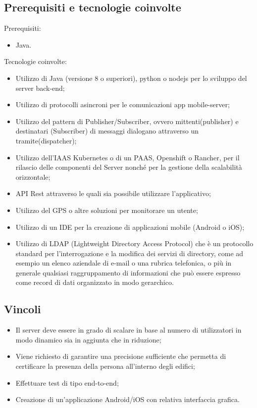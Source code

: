 \subsection{Prerequisiti e tecnologie coinvolte}
Prerequisiti:
\begin{itemize}
\item Java.
\end{itemize}
Tecnologie coinvolte:
\begin{itemize}
\item Utilizzo di Java (versione 8 o superiori), python o nodejs per lo sviluppo del server back-end;
\item Utilizzo di protocolli asincroni per le comunicazioni app mobile-server;
\item Utilizzo del pattern di Publisher/Subscriber, ovvero mittenti(publisher) e destinatari (Subscriber) di messaggi dialogano attraverso un tramite(dispatcher);
\item Utilizzo dell'IAAS Kubernetes o di un PAAS, Openshift o Rancher, per il rilascio delle componenti del Server nonch\'e per la gestione della scalabilit\`a orizzontale;
\item API Rest attraverso le quali sia possibile utilizzare l'applicativo;
\item Utilizzo del GPS o altre soluzioni per monitorare un utente;
\item Utilizzo di un IDE per la creazione di applicazioni mobile (Android o iOS);
\item Utilizzo di LDAP (Lightweight Directory Access Protocol) che \`e un protocollo standard per l'interrogazione e la modifica dei servizi di directory, come ad esempio un elenco aziendale di e-mail o una rubrica telefonica, o pi\`u in generale qualsiasi raggruppamento di informazioni che pu\`o essere espresso come record di dati organizzato in modo gerarchico.
\end{itemize}

\subsection{Vincoli}
\begin{itemize}
\item Il server deve essere in grado di scalare in base al numero di utilizzatori in modo dinamico sia in aggiunta che in riduzione;
\item Viene richiesto di garantire una precisione sufficiente che permetta di certificare la presenza della persona all'interno degli edifici;
\item Effettuare test di tipo end-to-end;
\item Creazione di un'applicazione Android/iOS con relativa interfaccia grafica.
\end{itemize}

